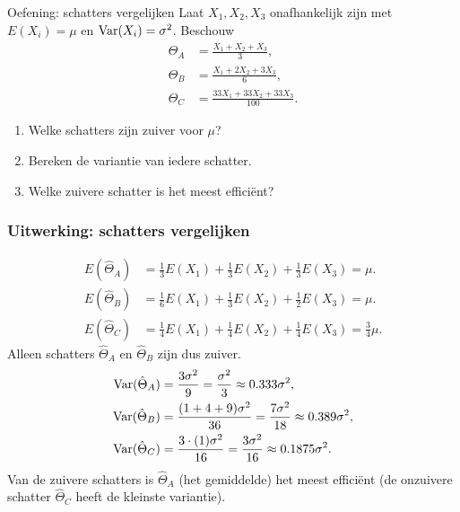     \begin{frame}{Oefening: schatters vergelijken}
        Laat $X_1, X_2, X_3$ onafhankelijk zijn met $E(X_i)=\mu$ en $\text{Var}(X_i)=\sigma^2$. 
        \vfill
        Beschouw
        \begin{align*}
            \hat{\Theta}_A &= \frac{X_1 + X_2 + X_3}{3},\\
            \hat{\Theta}_B &= \frac{X_1 + 2X_2 + 3X_3}{6},\\
            \hat{\Theta}_C &= \frac{33X_1 + 33X_2 + 33X_3}{100}.
        \end{align*}
        \begin{enumerate}
            \item Welke schatters zijn zuiver voor $\mu$?
            \item Bereken de variantie van iedere schatter.
            \item Welke zuivere schatter is het meest efficiënt?
        \end{enumerate}
    \end{frame}

    \begin{frame}\frametitle{Uitwerking: schatters vergelijken}
        {\small
        \begin{align*}
            E(\hat{\Theta}_A) &= \frac{1}{3}E(X_1) + \frac{1}{3}E(X_2) + \frac{1}{3}E(X_3) = \mu. \\
            E(\hat{\Theta}_B) &= \frac{1}{6}E(X_1) + \frac{1}{3}E(X_2) + \frac{1}{2}E(X_3) = \mu. \\
            E(\hat{\Theta}_C) &= \frac{1}{4}E(X_1) + \frac{1}{4}E(X_2) + \frac{1}{4}E(X_3) = \frac{3}{4}\mu.
        \end{align*}
        Alleen schatters $\hat{\Theta}_A$ en $\hat{\Theta}_B$ zijn dus zuiver.
        \begin{align*}
            \text{Var}(\hat{\Theta}_A) &= \frac{3\sigma^2}{9} = \frac{\sigma^2}{3} \approx 0.333\sigma^2, \\
            \text{Var}(\hat{\Theta}_B) &= \frac{(1+4+9)\sigma^2}{36} = \frac{7\sigma^2}{18} \approx 0.389\sigma^2,\\
            \text{Var}(\hat{\Theta}_C) &= \frac{3\cdot (1)\sigma^2}{16} = \frac{3\sigma^2}{16} \approx 0.1875\sigma^2.
        \end{align*}
        Van de zuivere schatters is $\hat{\Theta}_A$ (het gemiddelde) het meest efficiënt (de onzuivere
        schatter $\hat{\Theta}_C$ heeft de kleinste variantie).
        }
    \end{frame}

